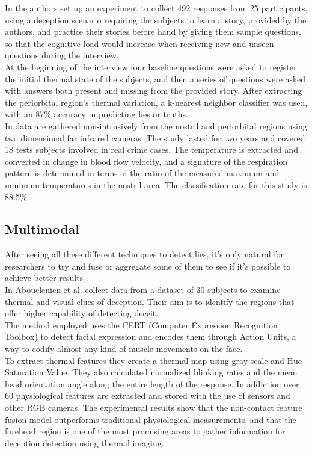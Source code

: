In \cite{Rajoub} the authors set up an experiment to collect 492 responses from 25 participants, using a deception scenario requiring the subjects to learn a story, provided by the authors, and practice their stories before hand by giving them sample questions, so that the cognitive load would increase when receiving new and unseen questions during the interview. \\

At the beginning of the interview four baseline questions were asked to register the initial thermal state of the subjects, and then a series of questions were asked, with answers both present and missing from the provided story. After extracting the periorbital region's thermal variation, a k-nearest neighbor classifier was used, with an 87\% accuracy in predicting lies or truths. \\

In \cite{6967765} data are gathered non-intrusively from the nostril and periorbital regions using two dimensional far infrared cameras. The study lasted for two years and covered 18 tests subjects involved in real crime cases. The temperature is extracted and converted in change in blood flow velocity, and a signature of the respiration pattern is determined in terms of the ratio of the measured maximum and minimum temperatures in the nostril area. The classification rate for this study is 88.5\%.

\subsection*{Multimodal}
After seeing all these different techniques to detect lies, it's only natural for researchers to try and fuse or aggregate some of them to see if it's possible to achieve better results \cite{Abouelenien:2014:DDU:2663204.2663229}. \\

In \cite{Abouelenien:2016:ATV:2910674.2910682} Abouelenien et al. collect data from a dataset of 30 subjects to examine thermal and visual clues of deception. Their aim is to identify the regions that offer higher capability of detecting deceit. \\
The method employed uses the CERT (Computer Expression Recognition Toolbox) to detect facial expression and encodes them through Action Units, a way to codify almost any kind of muscle movements on the face. \\
To extract thermal features they create a thermal map using gray-scale and Hue Saturation Value. They also calculated normalized blinking rates and the mean head orientation angle along the entire length of the response. In addiction over 60 physiological features are extracted and stored with the use of sensors and other RGB cameras. The experimental results show that the non-contact feature fusion model outperforms traditional physiological measurements, and that the forehead region is one of the most promising areas to gather information for deception detection using thermal imaging. \\

